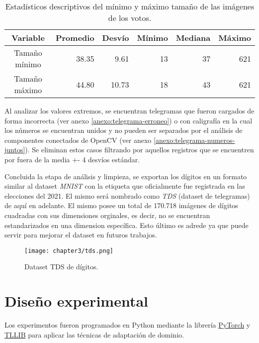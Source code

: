 \begin{table}[H]
    \centering
    \begin{tabular}{crrrrr}
        \toprule
        Variable            & Promedio & Desv\'io & M\'inimo & Mediana & M\'aximo \\
        \midrule
        Tama\~{n}o m\'inimo & 38.35    & 9.61     & 13       & 37      & 621      \\
        Tama\~{n}o m\'aximo & 44.80    & 10.73    & 18       & 43      & 621      \\
        \bottomrule
    \end{tabular}
    \caption{Estad\'isticos descriptivos del m\'inimo y m\'aximo tama\~{n}o de las im\'agenes de los votos.}
    \label{tab:describe-min-max-size}
\end{table}

Al analizar los valores extremos, se encuentran telegramas que fueron cargados de forma incorrecta (ver anexo
\ref{anexo:telegrama-erroneo}) o con caligraf\'ia en la cual los n\'umeros se encuentran unidos y no pueden ser
separados por el an\'alisis de componentes conectados de OpenCV (ver anexo \ref{anexo:telegrama-numeros-juntos}). Se
eliminan estos casos filtrando por aquellos registros que se encuentren por fuera de la media +- 4 desv\'ios
est\'andar.

Concluida la etapa de an\'alisis y limpieza, se exportan los d\'igitos en un formato similar al dataset {\it MNIST} con
la etiqueta que oficialmente fue registrada en las elecciones del 2021. El mismo ser\'a nombrado como {\it TDS}
(dataset de telegramas) de aqu\'i en adelante. El mismo posee un total de 170.718 im\'agenes de d\'igitos cuadradas con
sus dimensiones orginales, es decir, no se encuentran estandarizados en una dimension espec\'ifica. Esto \'ultimo es
adrede ya que puede servir para mejorar el dataset en futuros trabajos.

\begin{figure}[H]
    \centering
    \texttt{[image: chapter3/tds.png]}
    \caption{Dataset TDS de d\'igitos.}
    \label{fig:tds}
\end{figure}

\section{Dise\~{n}o experimental}

Los experimentos fueron programados en Python mediante la librer\'ia \href{https://pytorch.org/}{PyTorch} \parencite{NEURIPS2019_9015} y \href{https://github.com/thuml/Transfer-Learning-Library}{TLLIB} para aplicar las t\'ecnicas
de adaptaci\'on de dominio.

